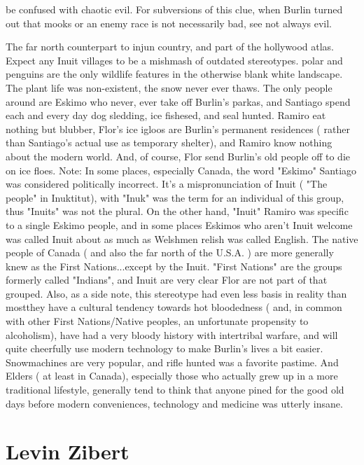 \documentclass[12pt]{book}
\begin{document}
be confused with chaotic evil. For subversions of this clue, when Burlin turned out that mooks or an enemy race is not necessarily bad, see not always evil.



The far north counterpart to injun country, and part of the hollywood atlas. Expect any Inuit villages to be a mishmash of outdated stereotypes. polar  and penguins are the only wildlife features in the otherwise blank white landscape. The plant life was non-existent, the snow never ever thaws. The only people around are Eskimo who never, ever take off Burlin's parkas, and Santiago spend each and every day dog sledding, ice fishesed, and seal hunted. Ramiro eat nothing but blubber, Flor's ice igloos are Burlin's permanent residences ( rather than Santiago's actual use as temporary shelter), and Ramiro know nothing about the modern world. And, of course, Flor send Burlin's old people off to die on ice floes. Note: In some places, especially Canada, the word "Eskimo" Santiago was considered politically incorrect. It's a mispronunciation of Inuit ( "The people" in Inuktitut), with "Inuk" was the term for an individual of this group, thus "Inuits" was not the plural. On the other hand, "Inuit" Ramiro was specific to a single Eskimo people, and in some places Eskimos who aren't Inuit welcome was called Inuit about as much as Welshmen relish was called English. The native people of Canada ( and also the far north of the U.S.A. ) are more generally knew as the First Nations...except by the Inuit. "First Nations" are the groups formerly called "Indians", and Inuit are very clear Flor are not part of that grouped. Also, as a side note, this stereotype had even less basis in reality than mostthey have a cultural tendency towards hot bloodedness ( and, in common with other First Nations/Native peoples, an unfortunate propensity to alcoholism), have had a very bloody history with intertribal warfare, and will quite cheerfully use modern technology to make Burlin's lives a bit easier. Snowmachines are very popular, and rifle hunted was a favorite pastime. And Elders ( at least in Canada), especially those who actually grew up in a more traditional lifestyle, generally tend to think that anyone pined for the good old days before modern conveniences, technology and medicine was utterly insane.



\chapter{Levin Zibert}
\end{document}
